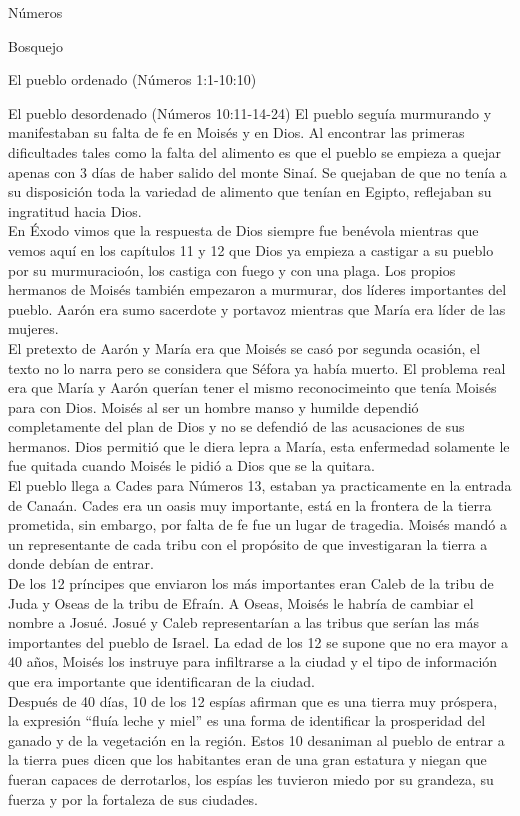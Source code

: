 \begin{section}{Números}
\begin{subsection}{Bosquejo}
\begin{subsubsection}{El pueblo ordenado (Números 1:1-10:10)}
		\end{subsubsection}
		\begin{subsubsection}{El pueblo desordenado (Números 10:11-14-24)}
		El pueblo seguía murmurando y manifestaban su falta de fe en Moisés y en Dios. Al encontrar las primeras dificultades tales como la falta del alimento es que el pueblo se empieza a quejar apenas con 3 días de haber salido del monte Sinaí. Se quejaban de que no tenía a su disposición toda la variedad de alimento que tenían en Egipto, reflejaban su ingratitud hacia Dios.\\
En Éxodo vimos que la respuesta de Dios siempre fue benévola mientras que vemos aquí en los capítulos 11 y 12 que Dios ya empieza a castigar a su pueblo por su murmuracioón, los castiga con fuego y con una plaga. Los propios hermanos de Moisés también empezaron a murmurar, dos líderes importantes del pueblo. Aarón era sumo sacerdote y portavoz mientras que María era líder de las mujeres.\\
El pretexto de Aarón y María era que Moisés se casó por segunda ocasión, el texto no lo narra pero se considera que Séfora ya había muerto. El problema real era que María y Aarón querían tener el mismo reconocimeinto que tenía Moisés para con Dios. Moisés al ser un hombre manso y humilde dependió completamente del plan de Dios y no se defendió de las acusaciones de sus hermanos. Dios permitió que le diera lepra a María, esta enfermedad solamente le fue quitada cuando Moisés le pidió a Dios que se la quitara.\\
El pueblo llega a Cades para Números 13, estaban ya practicamente en la entrada de Canaán. Cades era un oasis muy importante, está en la frontera de la tierra prometida, sin embargo, por falta de fe fue un lugar de tragedia. Moisés mandó a un representante de cada tribu con el propósito de que investigaran la tierra a donde debían de entrar.\\
De los 12 príncipes que enviaron los más importantes eran Caleb de la tribu de Juda y Oseas de la tribu de Efraín. A Oseas, Moisés le habría de cambiar el nombre a Josué. Josué y Caleb representarían a las tribus que serían las más importantes del pueblo de Israel. La edad de los 12 se supone que no era mayor a 40 años, Moisés los instruye para infiltrarse a la ciudad y el tipo de información que era importante que identificaran de la ciudad.\\
Después de 40 días, 10 de los 12 espías afirman que es una tierra muy próspera, la expresión ``fluía leche y miel'' es una forma de identificar la prosperidad del ganado y de la vegetación en la región. Estos 10 desaniman al pueblo de entrar a la tierra pues dicen que los habitantes eran de una gran estatura y niegan que fueran capaces de derrotarlos, los espías les tuvieron miedo por su grandeza, su fuerza y por la fortaleza de sus ciudades.\\

\end{subsubsection}
\end{subsection}
\end{section}
